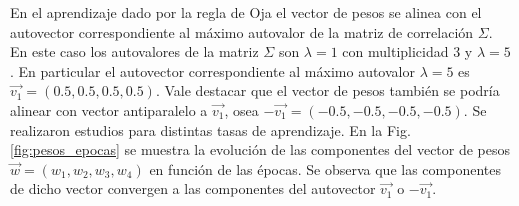 \documentclass[11pt,twocolumn,twoside]{opticajnl}
\begin{document}
En el aprendizaje dado por la regla de Oja el vector de pesos se alinea con el autovector correspondiente al máximo autovalor de la matriz de correlación $\Sigma$. En este caso los autovalores de la matriz $\Sigma$ son $\lambda = 1$ con multiplicidad 3 y $\lambda = 5$. En particular el autovector correspondiente al máximo autovalor $\lambda = 5$ es $\vec{v_1} = (0.5,0.5,0.5,0.5)$. Vale destacar que el vector de pesos también se podría alinear con vector antiparalelo a $\vec{v_1}$, osea $-\vec{v_1} = (-0.5,-0.5,-0.5,-0.5)$. Se realizaron estudios para distintas tasas de aprendizaje. En la Fig. \ref{fig:pesos_epocas} se muestra la evolución de las componentes del vector de pesos $\vec{w} = (w_1,w_2,w_3,w_4)$ en función de las épocas. Se observa que las componentes de dicho vector convergen a las componentes del autovector $\vec{v_1}$ o $-\vec{v_1}$. 
\end{document}
